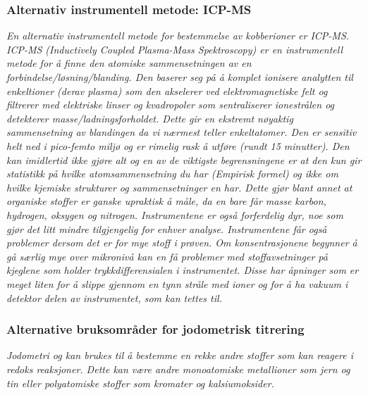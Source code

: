 \subsubsection{Alternativ instrumentell metode: ICP-MS}
\textit{En alternativ instrumentell metode for bestemmelse av kobberioner er ICP-MS\cite{ICPMSCopper}\cite{ICPMSCopper2}. ICP-MS (Inductively Coupled Plasma-Mass Spektroscopy) er en instrumentell metode for å finne den atomiske sammensetningen av en forbindelse/løsning/blanding. Den baserer seg på å komplet ionisere analytten til enkeltioner (derav plasma) som den akselerer ved elektromagnetiske felt og filtrerer med elektriske linser og kvadropoler som sentraliserer ionestrålen og detekterer masse/ladningsforholdet. Dette gir en ekstremt nøyaktig sammensetning av blandingen da vi nærmest teller enkeltatomer. Den er sensitiv helt ned i pico-femto miljø og er rimelig rask å utføre (rundt 15 minutter). Den kan imidlertid ikke gjøre alt og en av de viktigste begrensningene er at den kun gir statistikk på hvilke atomsammensetning du har (Empirisk formel) og ikke om hvilke kjemiske strukturer og sammensetninger en har. Dette gjør blant annet at organiske stoffer er ganske upraktisk å måle, da en bare får masse karbon, hydrogen, oksygen og nitrogen. Instrumentene er også forferdelig dyr, noe som gjør det litt mindre tilgjengelig for enhver analyse. Instrumentene får også problemer dersom det er for mye stoff i prøven. Om konsentrasjonene begynner å gå særlig mye over mikronivå kan en få problemer med stoffavsetninger på kjeglene som holder trykkdifferensialen i instrumentet. Disse har åpninger som er meget liten for å slippe gjennom en tynn stråle med ioner og for å ha vakuum i detektor delen av instrumentet, som kan tettes til.}

\subsubsection{Alternative bruksområder for jodometrisk titrering}

\textit{Jodometri og kan brukes til å bestemme en rekke andre stoffer som kan reagere i redoks reaksjoner. Dette kan være andre monoatomiske metallioner som jern\cite{IodimetryIron} og tin\cite{IodometryTin} eller polyatomiske stoffer som kromater\cite{IodimetryChromate} og kalsiumoksider\cite{IodometryCalciumOx}.}
